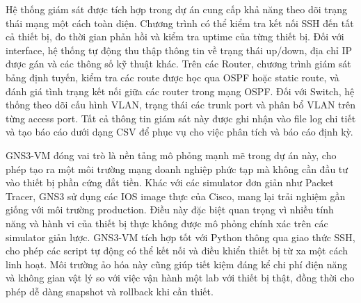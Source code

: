 Hệ thống giám sát được tích hợp trong dự án cung cấp khả năng theo dõi trạng thái mạng một cách toàn diện. Chương trình có thể kiểm tra kết nối SSH đến tất cả thiết bị, đo thời gian phản hồi và kiểm tra uptime của từng thiết bị. Đối với interface, hệ thống tự động thu thập thông tin về trạng thái up/down, địa chỉ IP được gán và các thông số kỹ thuật khác. Trên các Router, chương trình giám sát bảng định tuyến, kiểm tra các route được học qua OSPF hoặc static route, và đánh giá tình trạng kết nối giữa các router trong mạng OSPF. Đối với Switch, hệ thống theo dõi cấu hình VLAN, trạng thái các trunk port và phân bổ VLAN trên từng access port. Tất cả thông tin giám sát này được ghi nhận vào file log chi tiết và tạo báo cáo dưới dạng CSV để phục vụ cho việc phân tích và báo cáo định kỳ.

GNS3-VM đóng vai trò là nền tảng mô phỏng mạnh mẽ trong dự án này, cho phép tạo ra một môi trường mạng doanh nghiệp phức tạp mà không cần đầu tư vào thiết bị phần cứng đắt tiền. Khác với các simulator đơn giản như Packet Tracer, GNS3 sử dụng các IOS image thực của Cisco, mang lại trải nghiệm gần giống với môi trường production. Điều này đặc biệt quan trọng vì nhiều tính năng và hành vi của thiết bị thực không được mô phỏng chính xác trên các simulator giản lược. GNS3-VM tích hợp tốt với Python thông qua giao thức SSH, cho phép các script tự động có thể kết nối và điều khiển thiết bị từ xa một cách linh hoạt. Môi trường ảo hóa này cũng giúp tiết kiệm đáng kể chi phí điện năng và không gian vật lý so với việc vận hành một lab với thiết bị thật, đồng thời cho phép dễ dàng snapshot và rollback khi cần thiết.
    